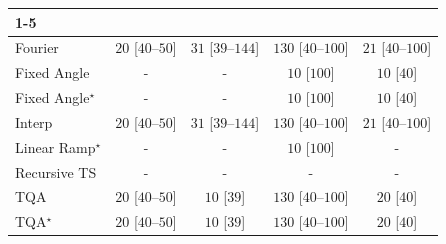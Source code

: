 \begin{tabular}{l|cccc|}
\cline{1-5}
\multicolumn{5}{c}{\rule{0pt}{8pt}PP} \\
\midrule
Fourier & {\cellcolor[HTML]{F5FBF3}} \color[HTML]{000000} $20$ [$40$--$50$] & {\cellcolor[HTML]{F3FAF0}} \color[HTML]{000000} $31$ [$39$--$144$] & {\cellcolor[HTML]{DAF0D4}} \color[HTML]{000000} $130$ [$40$--$100$] & {\cellcolor[HTML]{F5FBF2}} \color[HTML]{000000} $21$ [$40$--$100$] \\
Fixed Angle & {\cellcolor[HTML]{000000}} \color[HTML]{F1F1F1} {\cellcolor{white}} \color{black} - & {\cellcolor[HTML]{000000}} \color[HTML]{F1F1F1} {\cellcolor{white}} \color{black} - & {\cellcolor[HTML]{F7FCF5}} \color[HTML]{000000} $10$ [$100$] & {\cellcolor[HTML]{F7FCF5}} \color[HTML]{000000} $10$ [$40$] \\
Fixed Angle$^\star$ & {\cellcolor[HTML]{000000}} \color[HTML]{F1F1F1} {\cellcolor{white}} \color{black} - & {\cellcolor[HTML]{000000}} \color[HTML]{F1F1F1} {\cellcolor{white}} \color{black} - & {\cellcolor[HTML]{F7FCF5}} \color[HTML]{000000} $10$ [$100$] & {\cellcolor[HTML]{F7FCF5}} \color[HTML]{000000} $10$ [$40$] \\
Interp & {\cellcolor[HTML]{F5FBF3}} \color[HTML]{000000} $20$ [$40$--$50$] & {\cellcolor[HTML]{F3FAF0}} \color[HTML]{000000} $31$ [$39$--$144$] & {\cellcolor[HTML]{DAF0D4}} \color[HTML]{000000} $130$ [$40$--$100$] & {\cellcolor[HTML]{F5FBF2}} \color[HTML]{000000} $21$ [$40$--$100$] \\
Linear Ramp$^\star$ & {\cellcolor[HTML]{000000}} \color[HTML]{F1F1F1} {\cellcolor{white}} \color{black} - & {\cellcolor[HTML]{000000}} \color[HTML]{F1F1F1} {\cellcolor{white}} \color{black} - & {\cellcolor[HTML]{F7FCF5}} \color[HTML]{000000} $10$ [$100$] & {\cellcolor[HTML]{000000}} \color[HTML]{F1F1F1} {\cellcolor{white}} \color{black} - \\
Recursive TS & {\cellcolor[HTML]{000000}} \color[HTML]{F1F1F1} {\cellcolor{white}} \color{black} - & {\cellcolor[HTML]{000000}} \color[HTML]{F1F1F1} {\cellcolor{white}} \color{black} - & {\cellcolor[HTML]{000000}} \color[HTML]{F1F1F1} {\cellcolor{white}} \color{black} - & {\cellcolor[HTML]{000000}} \color[HTML]{F1F1F1} {\cellcolor{white}} \color{black} - \\
TQA & {\cellcolor[HTML]{F5FBF3}} \color[HTML]{000000} $20$ [$40$--$50$] & {\cellcolor[HTML]{F7FCF5}} \color[HTML]{000000} $10$ [$39$] & {\cellcolor[HTML]{DAF0D4}} \color[HTML]{000000} $130$ [$40$--$100$] & {\cellcolor[HTML]{F5FBF3}} \color[HTML]{000000} $20$ [$40$] \\
TQA$^\star$ & {\cellcolor[HTML]{F5FBF3}} \color[HTML]{000000} $20$ [$40$--$50$] & {\cellcolor[HTML]{F7FCF5}} \color[HTML]{000000} $10$ [$39$] & {\cellcolor[HTML]{DAF0D4}} \color[HTML]{000000} $130$ [$40$--$100$] & {\cellcolor[HTML]{F5FBF3}} \color[HTML]{000000} $20$ [$40$] \\

\end{tabular}
